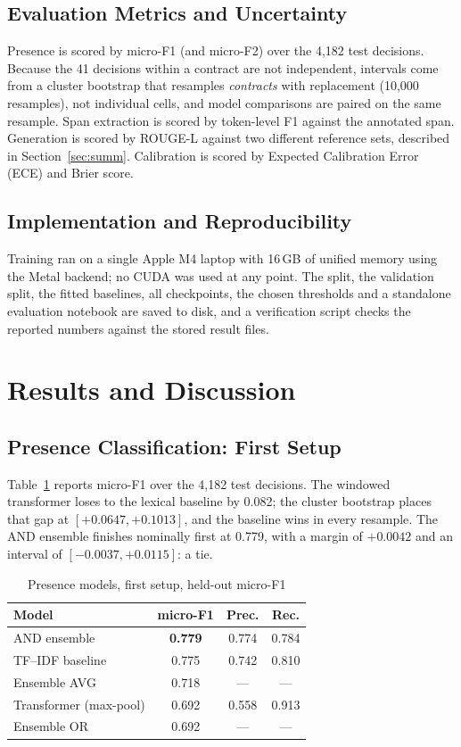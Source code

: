 \documentclass[journal]{IEEEtran}
\begin{document}
\subsection{Evaluation Metrics and Uncertainty}
Presence is scored by micro-F1 (and micro-F2) over the 4,182 test decisions. Because the 41
decisions within a contract are not independent, intervals come from a cluster bootstrap that
resamples \emph{contracts} with replacement (10,000 resamples), not individual cells, and model
comparisons are paired on the same resample. Span extraction is scored by token-level F1 against the
annotated span. Generation is scored by ROUGE-L against two different reference sets, described in
Section~\ref{sec:summ}. Calibration is scored by Expected Calibration Error (ECE) and Brier score.

\subsection{Implementation and Reproducibility}
Training ran on a single Apple M4 laptop with 16\,GB of unified memory using the Metal backend; no
CUDA was used at any point. The split, the validation split, the fitted baselines, all checkpoints,
the chosen thresholds and a standalone evaluation notebook are saved to disk, and a verification
script checks the reported numbers against the stored result files.

\section{Results and Discussion}

\subsection{Presence Classification: First Setup}
Table~\ref{tab:presence} reports micro-F1 over the 4,182 test decisions. The windowed transformer
loses to the lexical baseline by 0.082; the cluster bootstrap places that gap at $[+0.0647,+0.1013]$,
and the baseline wins in every resample. The AND ensemble finishes nominally first at 0.779, with a
margin of $+0.0042$ and an interval of $[-0.0037,+0.0115]$: a tie.

\begin{table}[!t]
\caption{Presence models, first setup, held-out micro-F1}
\label{tab:presence}
\centering
\begin{tabular}{lccc}
\toprule
\textbf{Model} & \textbf{micro-F1} & \textbf{Prec.} & \textbf{Rec.}\\
\midrule
AND ensemble           & \textbf{0.779} & 0.774 & 0.784\\
TF--IDF baseline       & 0.775 & 0.742 & 0.810\\
Ensemble AVG           & 0.718 & --- & ---\\
Transformer (max-pool) & 0.692 & 0.558 & 0.913\\
Ensemble OR            & 0.692 & --- & ---\\
\bottomrule
\end{tabular}
\end{table}
\end{document}
